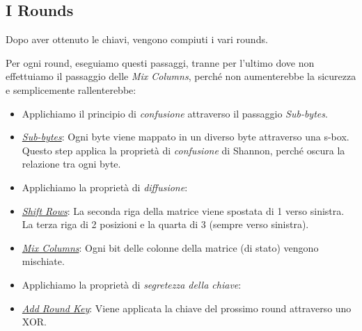 



\subsection{I Rounds} %

\textsf{\small Dopo aver ottenuto le chiavi, vengono compiuti i vari rounds.} 

\textsf{\small Per ogni round, eseguiamo questi passaggi, tranne per l'ultimo dove non effettuiamo il passaggio delle \emph{Mix Columns}, perché non aumenterebbe la sicurezza e semplicemente rallenterebbe: } %

\begin{itemize}
	\item[] \textsf{\small Applichiamo il principio di \emph{confusione} attraverso il passaggio \emph{Sub-bytes}.}
	\item \textsf{\small \underline{\emph{Sub-bytes}}: Ogni byte viene mappato in un diverso byte attraverso una s-box. Questo step applica la proprietà di \emph{confusione} di Shannon, perché oscura la relazione tra ogni byte.}
	\item[] \textsf{\small Applichiamo la proprietà di \emph{diffusione}:}
	\item \textsf{\small \underline{\emph{Shift Rows}}: La seconda riga della matrice viene spostata di 1 verso sinistra. La terza riga di 2 posizioni e la quarta di 3 (sempre verso sinistra).}
	\item \textsf{\small \underline{\emph{Mix Columns}}: Ogni bit delle colonne della matrice (di stato) vengono mischiate.} %
	\item[] \textsf{\small Applichiamo la proprietà di \emph{segretezza della chiave}:}
	\item \textsf{\small \underline{\emph{Add Round Key}}: Viene applicata la chiave del prossimo round attraverso uno XOR.} %
\end{itemize}

